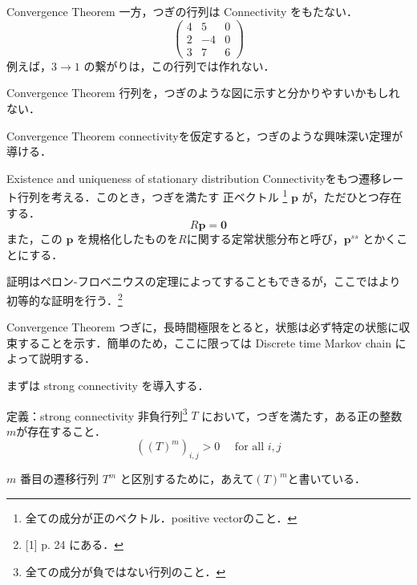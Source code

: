 \documentclass[aspectratio=169, dvipdfmx, 11pt,uplatex]{beamer} %
\begin{document}
\begin{frame}{Convergence Theorem}
  一方，つぎの行列は Connectivity をもたない．
  \begin{equation}
    \begin{pmatrix}
      4 & 5 & 0 \\
      2 & -4 & 0 \\
      3 & 7 & 6
    \end{pmatrix}
  \end{equation}
  例えば，$3 \to 1$ の繋がりは，この行列では作れない．
\end{frame}

\begin{frame}{Convergence Theorem}
  行列を，つぎのような図に示すと分かりやすいかもしれない．
\end{frame}

\begin{frame}{Convergence Theorem}
  connectivityを仮定すると，つぎのような興味深い定理が導ける．
  \begin{block}{Existence and uniqueness of stationary distribution}
    Connectivityをもつ遷移レート行列を考える．このとき，つぎを満たす 正ベクトル \footnote{全ての成分が正のベクトル．positive vectorのこと．} $\mathbf{p}$ が，ただひとつ存在する．
    \begin{equation}
      R \mathbf{p} = \mathbf{0}
    \end{equation}
    また，この $\mathbf{p}$ を規格化したものを$R$に関する定常状態分布と呼び，$\mathbf{p}^{ss}$ とかくことにする．
  \end{block}
  証明はペロン-フロベニウスの定理によってすることもできるが，ここではより初等的な証明を行う．\footnote{[1] p. 24 にある．}
\end{frame}

\begin{frame}{Convergence Theorem}
  つぎに，長時間極限をとると，状態は必ず特定の状態に収束することを示す．簡単のため，ここに限っては Discrete time Markov chain によって説明する．\par 
  まずは strong connectivity を導入する．
  \begin{block}{定義：strong connectivity}
    非負行列\footnote{全ての成分が負ではない行列のこと．} $T$ において，つぎを満たす，ある正の整数 $m$が存在すること．
    \begin{equation}
      ((T)^m)_{i, j} > 0 \quad \text{ for all } i, j
    \end{equation}
  \end{block}
  $m$ 番目の遷移行列 $T^m$ と区別するために，あえて$(T)^m$と書いている．
\end{frame}
\end{document}
